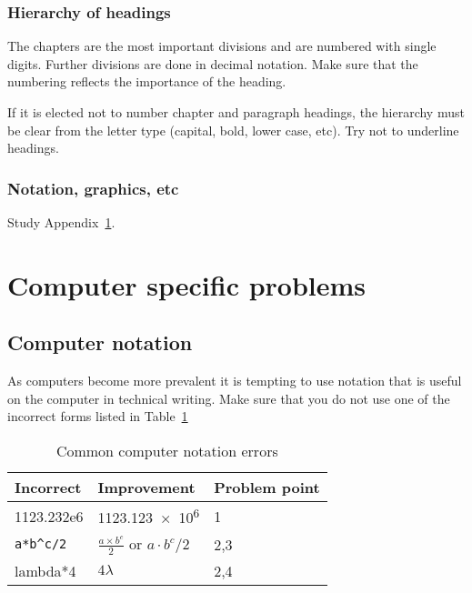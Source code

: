 \documentclass[a4paper,12pt]{article}
\begin{document}
\subsubsection{Hierarchy of headings}
\label{sec:hierarchy-headings}
The chapters are the most important divisions and are numbered with
single digits.  Further divisions are done in decimal notation.  Make
sure that the numbering reflects the importance of the heading.

If it is elected not to number chapter and paragraph headings, the
hierarchy must be clear from the letter type (capital, bold, lower
case, etc).  Try not to underline headings.

\subsubsection{Notation, graphics, etc}
Study Appendix~\ref{app:computerproblems}.


\section{Computer specific problems}
\label{app:computerproblems}
\subsection{Computer notation}
\label{sec:compnotation}

As computers become more prevalent it is tempting to use notation that
is useful on the computer in technical writing.  Make sure that you do
not use one of the incorrect forms listed in
Table~\ref{tab:compnotation}
\begin{table}[htbp]
  \caption{Common computer notation errors}
  \label{tab:compnotation}
  \begin{centering}
    \begin{tabular}{lll}
      \toprule
      Incorrect & Improvement & Problem point \\
      \midrule
      1123.232e6 & \num{1123.123e6} & 1 \\
      \verb|a*b^c/2| & $\frac{a \times b^c}{2}$ or $a\cdot b^c / 2$ &
                                                                      2,3 \\
      lambda*4 & $4\lambda$ & 2,4 \\
      \bottomrule
    \end{tabular}\\
  \end{centering}
\end{table}
\end{document}
